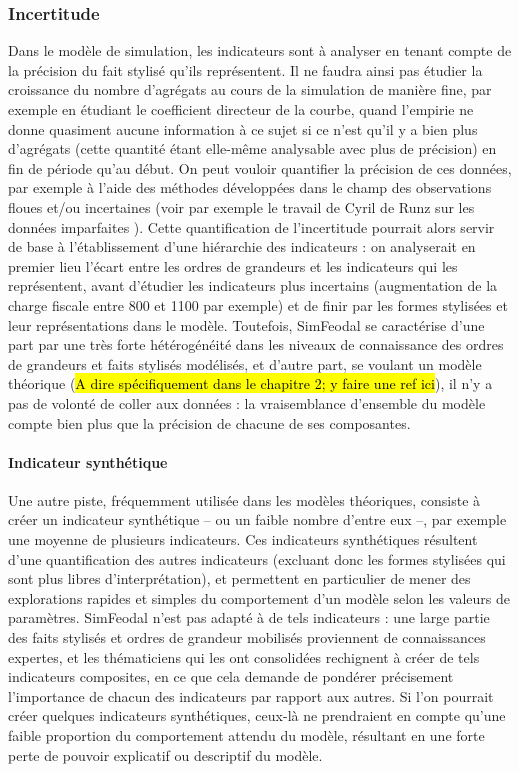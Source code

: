 \subsubsection{Incertitude}
Dans le modèle de simulation, les indicateurs sont à analyser en tenant compte de la précision du fait stylisé qu'ils représentent. Il ne faudra ainsi pas étudier la croissance  du nombre d'agrégats au cours de la simulation de manière fine, par exemple en étudiant le coefficient directeur de la courbe, quand l'empirie ne donne quasiment aucune information à ce sujet si ce n'est qu'il y a bien plus d'agrégats (cette quantité étant elle-même analysable avec plus de précision) en fin de période qu'au début.
On peut vouloir quantifier la précision de ces données, par exemple à l'aide des méthodes développées dans le champ des observations floues et/ou incertaines (voir par exemple le travail de Cyril de Runz sur les données \og imparfaites\fg{} \autocite{de2008imperfection}).
Cette quantification de l'incertitude pourrait alors servir de base à l'établissement d'une hiérarchie des indicateurs : on analyserait en premier lieu l'écart entre les ordres de grandeurs et les indicateurs qui les représentent, avant d'étudier les indicateurs plus incertains (augmentation de la charge fiscale entre 800 et 1100 par exemple) et de finir par les formes stylisées et leur représentations dans le modèle.
Toutefois, SimFeodal se caractérise d'une part par une très forte hétérogénéité dans les niveaux de connaissance des ordres de grandeurs et faits stylisés modélisés, et d'autre part, se voulant un modèle théorique (\hl{A dire spécifiquement dans le chapitre 2; y faire une ref ici}), il n'y a pas de volonté de \og coller aux données\fg{} : la vraisemblance d'ensemble du modèle compte bien plus que la précision de chacune de ses composantes.

\paragraph{Indicateur synthétique}
Une autre piste, fréquemment utilisée dans les modèles théoriques, consiste à créer un indicateur synthétique -- ou un faible nombre d'entre eux --,  par exemple une moyenne de plusieurs indicateurs.
Ces indicateurs synthétiques résultent d'une quantification des autres indicateurs (excluant donc les formes stylisées qui sont plus libres d'interprétation), et permettent en particulier de mener des explorations rapides et simples du comportement d'un modèle selon les valeurs de paramètres.
SimFeodal n'est pas adapté à de tels indicateurs : une large partie des faits stylisés et ordres de grandeur mobilisés proviennent de connaissances expertes, et les thématiciens qui les ont consolidées rechignent à créer de tels indicateurs composites, en ce que cela demande de pondérer précisement l'importance de chacun des indicateurs par rapport aux autres. Si l'on pourrait créer quelques indicateurs synthétiques, ceux-là ne prendraient en compte qu'une faible proportion du comportement attendu du modèle, résultant en une forte perte de pouvoir explicatif ou descriptif du modèle.

